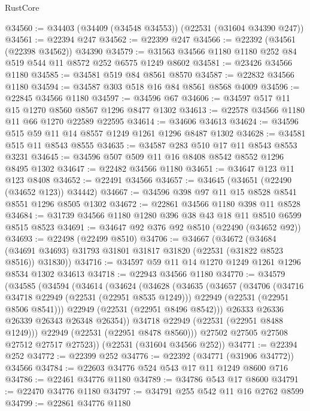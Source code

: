 \begin{lexlean}{RustCore}
\begin{coremodule}
@34560 := @34403 (@34409 (@34548 @34553)) (@22531 (@31604 @34390 @247))
@34561 := @22394 @247
@34562 := @22399 @247
@34566 := @22392 (@34561 (@22398 @34562)) @34390
@34579 := @31563 @34566 @1180 @1180 @252 @84 @519 @544 @11 @8572 @252 @6575 @1249 @8602
@34581 := @23426 @34566 @1180
@34585 := @34581 @519 @84 @8561 @8570
@34587 := @22832 @34566 @1180
@34594 := @34587 @303 @518 @16 @84 @8561 @8568 @4009
@34596 := @22845 @34566 @1180
@34597 := @34596 @67
@34606 := @34597 @517 @11 @15 @1270 @8560 @8567 @1296 @8477 @1302
@34613 := @22578 @34566 @1180 @11 @66 @1270 @22589 @22595
@34614 := @34606 @34613
@34624 := @34596 @515 @59 @11 @14 @8557 @1249 @1261 @1296 @8487 @1302
@34628 := @34581 @515 @11 @8543 @8555
@34635 := @34587 @283 @510 @17 @11 @8543 @8553 @3231
@34645 := @34596 @507 @509 @11 @16 @8408 @8542 @8552 @1296 @8495 @1302
@34647 := @22482 @34566 @1180
@34651 := @34647 @123 @11 @123 @8408
@34652 := @22491 @34566
@34657 := @34645 (@34651 (@22490 (@34652 @123)) @34442)
@34667 := @34596 @398 @97 @11 @15 @8528 @8541 @8551 @1296 @8505 @1302
@34672 := @22861 @34566 @1180 @398 @11 @8528
@34684 := @31739 @34566 @1180 @1280 @396 @38 @43 @18 @11 @8510 @6599 @8515 @8523
@34691 := @34647 @92 @376 @92 @8510 (@22490 (@34652 @92))
@34693 := @22498 (@22499 @8510)
@34706 := @34667
    (@34672
      (@34684 (@34691 @34693) @31793 @31801 @31817 @31820 (@22531 (@31822 @8523 @8516)) @31830))
@34716 := @34597 @59 @11 @14 @1270 @1249 @1261 @1296 @8534 @1302 @34613
@34718 := @22943 @34566 @1180
@34770 := @34579
    (@34585
      (@34594
        (@34614
          (@34624
            (@34628
              (@34635
                (@34657
                  (@34706
                    (@34716 @34718 @22949 (@22531 (@22951 @8535 @1249)))
                    @22949
                    (@22531 (@22951 @8506 @8541)))
                  @22949
                  (@22531 (@22951 @8496 @8542)))
                @26333
                @26336
                @26339
                @26343
                @26348
                @26354))
            @34718
            @22949
            (@22531 (@22951 @8488 @1249)))
          @22949
          (@22531 (@22951 @8478 @8560)))
        @27502
        @27505
        @27508
        @27512
        @27517
        @27523))
    (@22531 (@31604 @34566 @252))
@34771 := @22394 @252
@34772 := @22399 @252
@34776 := @22392 (@34771 (@31906 @34772)) @34566
@34784 := @22603 @34776 @524 @543 @17 @11 @1249 @8600 @716
@34786 := @22461 @34776 @1180
@34789 := @34786 @543 @17 @8600
@34791 := @22470 @34776 @1180
@34797 := @34791 @255 @542 @11 @16 @2762 @8599
@34799 := @22861 @34776 @1180

\end{coremodule}
\end{lexlean}
